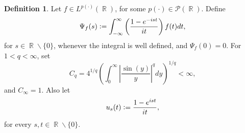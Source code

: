 \documentclass[11pt,reqno]{amsart}
\newtheorem{prop}[theorem]{Proposition}
\theoremstyle{definition}
\theoremstyle{definition}
\theoremstyle{definition}
\newtheorem{definition}[theorem]{Definition}
\DeclareMathOperator{\R}{\mathbb{R}}
\newcommand{\p}{p(\cdot)}
\newcommand{\Lp}{L^{\p}(\R)}
\newcommand{\defeq}{\vcentcolon=}
\begin{document}
\begin{definition}
    Let $f\in L^{\p}(\R)$, for some $\p\in\mathcal{P}(\R)$. Define
    \begin{equation*}
        \Psi_f(s)\defeq\int_{-\infty}^{\infty}\left(\frac{1-e^{-ist}}{it}\right)f(t)dt,
    \end{equation*}
    for $s\in\R\backslash\{0\}$, whenever the integral is well defined, and $\Psi_f(0)=0$. For $1<q<\infty$, set
    \begin{equation}
      C_q= 4^{1/q}\left(\int_0^{\infty}\left|\frac{\sin(y)}{y}\right|^{q}dy\right)^{1/q}<\infty,
    \end{equation}
    and $C_\infty=1$. Also let 
    \begin{equation*}
            u_s(t)\defeq\frac{1-e^{ist}}{it}, 
    \end{equation*}
for every $s,t\in\R\backslash\{0\}$.
\end{definition}






\end{document}
